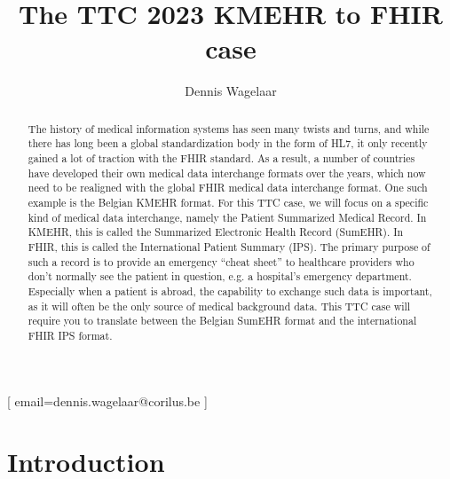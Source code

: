 \documentclass[
twocolumn,
]{ceurart}
\begin{document}


\title{The TTC 2023 KMEHR to FHIR case}
\author[1]{Dennis Wagelaar}[%
email=dennis.wagelaar@corilus.be
]
\address[1]{  Corilus nv,
  Gaston Crommenlaan 4, 9050 Gent}

\maketitle

\begin{abstract}
The history of medical information systems has seen many twists and turns, and 
while there has long been a global standardization body in the form of HL7, it 
only recently gained a lot of traction with the FHIR standard. As a result, a 
number of countries have developed their own medical data interchange formats 
over the years, which now need to be realigned with the global FHIR medical 
data interchange format. One such example is the Belgian KMEHR format. 
For this TTC case, we will focus on a specific kind of medical data 
interchange, namely the Patient Summarized Medical Record. In KMEHR, this is 
called the Summarized Electronic Health Record (SumEHR). In FHIR, this is 
called the International Patient Summary (IPS). The primary purpose of such a 
record is to provide an emergency ``cheat sheet'' to healthcare providers who 
don't normally see the patient in question, e.g. a hospital's emergency 
department. Especially when a patient is abroad, the capability to exchange 
such data is important, as it will often be the only source of medical 
background data. This TTC case will require you to translate between the 
Belgian SumEHR format and the international FHIR IPS format.
\end{abstract}

\section{Introduction}
\end{document}
